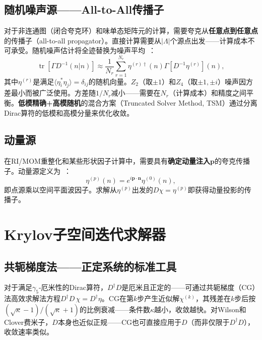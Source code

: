 \documentclass[12pt,a4paper]{ctexart}
\theoremstyle{definition}
\begin{document}
\subsection{随机噪声源——All-to-All传播子}

对于非连通图（闭合夸克环）和味单态矩阵元的计算，需要夸克从\textbf{任意点到任意点}的传播子（all-to-all propagator）。直接计算需要从\begin{math}|\Lambda|\end{math}个源点出发——计算成本不可承受。随机噪声估计将全迹替换为噪声平均~\cite{GattringerLang2010}：
\begin{equation}
\operatorname{tr}[\Gamma D^{-1}(n|n)] \approx \frac{1}{N_r} \sum_{r=1}^{N_r} \eta^{(r)\dagger}(n) \Gamma [D^{-1} \eta^{(r)}](n),
\label{eq:stochastic_all_to_all}
\end{equation}
其中$\eta^{(r)}$是满足$\langle \eta_i^* \eta_j \rangle = \delta_{ij}$的随机向量。$Z_2$（取$\pm 1$）和$Z_4$（取$\pm 1, \pm i$）噪声因方差最小而被广泛使用。方差随$1/N_r$减小——需要在$N_r$（计算成本）和精度之间平衡。\textbf{低模精确+高模随机}的混合方案（Truncated Solver Method, TSM）通过分离Dirac算符的低模和高模分量来优化收敛。

\subsection{动量源}

在RI/MOM重整化和某些形状因子计算中，需要具有\textbf{确定动量注入}$\mathbf{p}$的夸克传播子。动量源定义为~\cite{GattringerLang2010}：
\begin{equation}
\eta^{(p)}(n) = e^{i\mathbf{p}\cdot\mathbf{n}} \eta^{(0)}(n),
\label{eq:momentum_source}
\end{equation}
即点源乘以空间平面波因子。求解从$\eta^{(p)}$出发的$D\chi = \eta^{(p)}$即获得动量投影的传播子。

\section{Krylov子空间迭代求解器}

\subsection{共轭梯度法——正定系统的标准工具}

对于满足$\gamma_5$-厄米性的Dirac算符，$D^\dagger D$是厄米且正定的——可通过共轭梯度（CG）法高效求解法方程$D^\dagger D\, \chi = D^\dagger \eta$。CG在第$k$步产生近似解$\chi^{(k)}$，其残差在$k$步后按$(\sqrt{\kappa}-1)/(\sqrt{\kappa}+1)$的比例衰减——条件数$\kappa$越小，收敛越快。对Wilson和Clover费米子，$D$本身也近似正规——CG也可直接应用于$D$（而非仅限于$D^\dagger D$），收敛速率类似。
\end{document}
